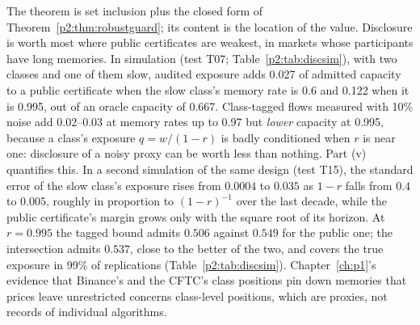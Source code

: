 The theorem is set inclusion plus the closed form of Theorem~\ref{p2:thm:robustguard}; its content is the location of the value. Disclosure is worth most where public certificates are weakest, in markets whose participants have long memories. In simulation (test T07; Table~\ref{p2:tab:discsim}), with two classes and one of them slow, audited exposure adds 0.027 of admitted capacity to a public certificate when the slow class's memory rate is 0.6 and 0.122 when it is 0.995, out of an oracle capacity of 0.667. Class-tagged flows measured with 10\% noise add 0.02--0.03 at memory rates up to 0.97 but \emph{lower} capacity at 0.995, because a class's exposure $q=w/(1-r)$ is badly conditioned when $r$ is near one: disclosure of a noisy proxy can be worth less than nothing. Part (v) quantifies this. In a second simulation of the same design (test T15), the standard error of the slow class's exposure rises from $0.0004$ to $0.035$ as $1-r$ falls from $0.4$ to $0.005$, roughly in proportion to $(1-r)^{-1}$ over the last decade, while the public certificate's margin grows only with the square root of its horizon. At $r=0.995$ the tagged bound admits $0.506$ against $0.549$ for the public one; the intersection admits $0.537$, close to the better of the two, and covers the true exposure in 99\% of replications (Table~\ref{p2:tab:discsim}). Chapter~\ref{ch:p1}'s evidence that Binance's and the CFTC's class positions pin down memories that prices leave unrestricted concerns class-level positions, which are proxies, not records of individual algorithms.

